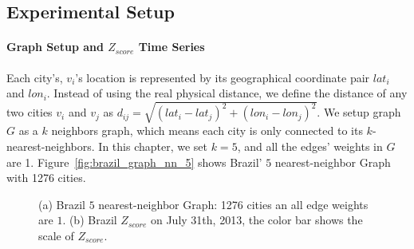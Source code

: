 \subsection{Experimental Setup}
\label{sec:experimental_setup}

\paragraph{Graph Setup and $Z_{score}$ Time Series}
Each city's, $v_i$'s  location is represented by its geographical coordinate pair $lat_i$ and $lon_i$. Instead of using the real physical distance, we  define the distance of any two cities $v_i$ and $v_j$ as $d_{ij}=\sqrt{(lat_i-lat_j)^2+(lon_i-lon_j)^2}$. We setup graph $G$ as a $k$ neighbors graph, which means  each city is only  connected to its $k$-nearest-neighbors. In this chapter, we set $k=5$, and all the edges' weights  in $G$ are 1. Figure~\ref{fig:brazil_graph_nn_5} shows Brazil' $5$ nearest-neighbor Graph with 1276 cities.

\begin{figure}[th]
	\centering
	\caption{(a) Brazil $5$ nearest-neighbor Graph: 1276 cities an all edge weights are $1$. (b) Brazil $Z_{score}$ on July 31th, 2013, the color bar shows the scale of $Z_{score}$.}
	\label{fig:graphwaveletcoefficient}
\end{figure}


